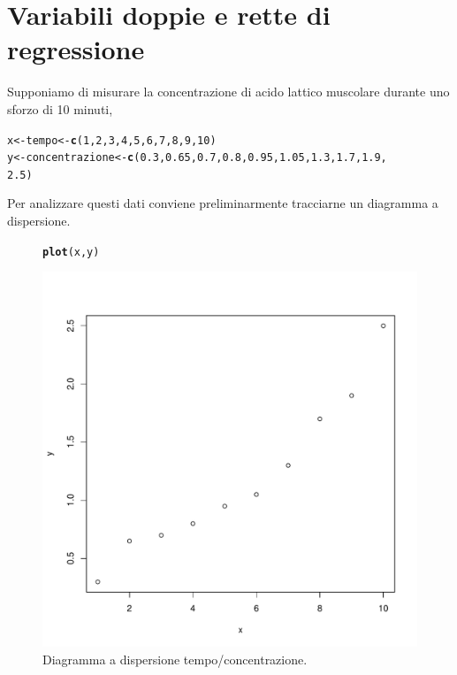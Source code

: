 \documentclass[onecolumn,12pt]{book}\usepackage[]{graphicx}\usepackage[]{color}
\makeatletter
\def\maxwidth{ %
  \ifdim\Gin@nat@width>\linewidth
    \linewidth
  \else
    \Gin@nat@width
  \fi
}
\newcommand{\hlnum}[1]{\textcolor[rgb]{0.686,0.059,0.569}{#1}}%
\newcommand{\hlstd}[1]{\textcolor[rgb]{0.345,0.345,0.345}{#1}}%
\newcommand{\hlkwb}[1]{\textcolor[rgb]{0.69,0.353,0.396}{#1}}%
\newcommand{\hlkwd}[1]{\textcolor[rgb]{0.737,0.353,0.396}{\textbf{#1}}}%
\newenvironment{kframe}{%
 \def\at@end@of@kframe{}%
 \ifinner\ifhmode%
  \def\at@end@of@kframe{\end{minipage}}%
  \begin{minipage}{\columnwidth}%
 \fi\fi%
 \def\FrameCommand##1{\hskip\@totalleftmargin \hskip-\fboxsep
 \colorbox{shadecolor}{##1}\hskip-\fboxsep
     \hskip-\linewidth \hskip-\@totalleftmargin \hskip\columnwidth}%
 \MakeFramed {\advance\hsize-\width
   \@totalleftmargin\z@ \linewidth\hsize
   \@setminipage}}%
 {\par\unskip\endMakeFramed%
 \at@end@of@kframe}
\newenvironment{knitrout}{}{} %
\makeatother
\begin{document}
\section{Variabili doppie e rette di regressione}
Supponiamo di misurare la concentrazione di acido lattico muscolare durante uno sforzo di 10 minuti,
\begin{knitrout}
\color{fgcolor}\begin{kframe}
\begin{alltt}
\hlstd{x}\hlkwb{<-}\hlstd{tempo}\hlkwb{<-}\hlkwd{c}\hlstd{(}\hlnum{1}\hlstd{,}\hlnum{2}\hlstd{,}\hlnum{3}\hlstd{,}\hlnum{4}\hlstd{,}\hlnum{5}\hlstd{,}\hlnum{6}\hlstd{,}\hlnum{7}\hlstd{,}\hlnum{8}\hlstd{,}\hlnum{9}\hlstd{,}\hlnum{10}\hlstd{)}
\hlstd{y}\hlkwb{<-}\hlstd{concentrazione}\hlkwb{<-}\hlkwd{c}\hlstd{(}\hlnum{0.3}\hlstd{,}\hlnum{0.65}\hlstd{,}\hlnum{0.7}\hlstd{,}\hlnum{0.8}\hlstd{,}\hlnum{0.95}\hlstd{,}\hlnum{1.05}\hlstd{,}\hlnum{1.3}\hlstd{,}\hlnum{1.7}\hlstd{,}\hlnum{1.9}\hlstd{,}
\hlnum{2.5}\hlstd{)}
\end{alltt}
\end{kframe}
\end{knitrout}
Per analizzare questi dati conviene preliminarmente tracciarne un diagramma a dispersione.
\begin{figure}[htbp]
\begin{center}
\begin{knitrout}
\color{fgcolor}\begin{kframe}
\begin{alltt}
\hlkwd{plot}\hlstd{(x,y)}
\end{alltt}
\end{kframe}
\includegraphics[width=\maxwidth]{figure/unnamed-chunk-115-1} 

\end{knitrout}
\caption{Diagramma a dispersione tempo/concentrazione.}
\label{fig:scatte}
\end{center}
\end{figure}
\end{document}
